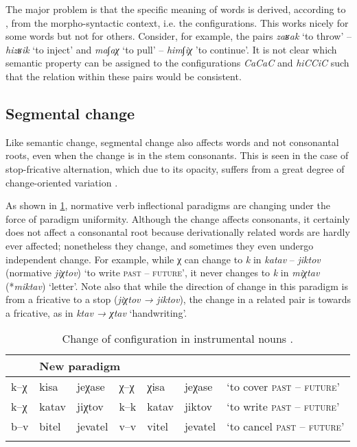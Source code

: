 \documentclass[output=paper,
modfonts
]{LSP/langsci}
\begin{document}
The major problem is that the specific meaning of words is derived,
according to \citet{arad2005a}, from the morpho-syntactic context, i.e. the
configurations. This works nicely for some words but not for others.
Consider, for example, the pairs \emph{zaʁak} `to throw' --
\emph{hizʁik} `to inject' and \emph{ma∫aχ} `to pull' -- \emph{him∫iχ}
'to continue'. It is not clear which semantic property can be assigned
to the configurations \emph{CaCaC} and \emph{hiCCiC} such that the
relation within these pairs would be consistent.

\subsection{Segmental change}\label{segmental-change}

Like semantic change, segmental change also affects words and not
consonantal roots, even when the change is in the stem consonants. This
is seen in the case of stop-fricative alternation, which due to its
opacity, suffers from a great degree of change-oriented variation \citep{adam2002a}.


As shown in \cref{tab:stopfric}, normative verb inflectional paradigms are changing under
the force of paradigm uniformity. Although the change affects consonants, it certainly does not affect a
consonantal root because derivationally related words are hardly ever
affected; nonetheless they change, and sometimes they even undergo independent
change. For example, while χ can change to \emph{k} in \emph{katav} --
\emph{jiktov} (normative \emph{jiχtov}) `to write \textsc{past --
	future',} it never changes to \emph{k} in \emph{miχtav} (*\emph{miktav})
`letter'. Note also that while the direction of change in this paradigm
is from a fricative to a stop (\emph{jiχtov → jiktov}), the change in a
related pair is towards a fricative, as in \emph{ktav → χtav}
`handwriting'.

\begin{table}
	
	\begin{tabular}{lllllll}
		\lsptoprule
		\multicolumn{3}{l}{Old paradigm} & 
		\multicolumn{3}{l}{New paradigm} & \\
		\midrule
		k--χ &kisa & jeχase & χ--χ &χisa & jeχase & `to cover \textsc{past -- future}'\\
		k--χ &katav & jiχtov & k--k &katav & jiktov & `to write \textsc{past -- future}'\\
		b--v &bitel & jevatel & v--v &vitel & jevatel & `to cancel \textsc{past -- future}' \\
		\lspbottomrule
	\end{tabular}
	\caption{Change of configuration in instrumental nouns \citep{adam2002a}.}
	\label{tab:stopfric}
\end{table}
\end{document}

